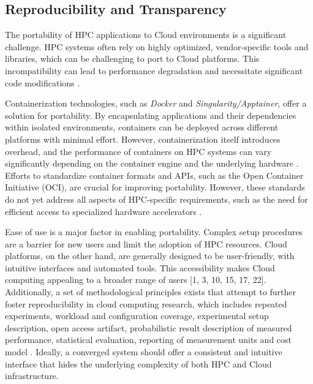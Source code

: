 




\subsection{Reproducibility and Transparency}
\label{sec:reproducetransparency}
    The portability of HPC applications to Cloud environments is a significant challenge. HPC systems often rely on highly optimized, vendor-specific tools and libraries, which can be challenging to port to Cloud platforms. This incompatibility can lead to performance degradation and necessitate significant code modifications \cite{zhao_resource_2023, liao_bridging_2021, choudhary_exascale_2021}.

    Containerization technologies, such as \textit{Docker} and \textit{Singularity/Apptainer}, offer a solution for portability. By encapsulating applications and their dependencies within isolated environments, containers can be deployed across different platforms with minimal effort. However, containerization itself introduces overhead, and the performance of containers on HPC systems can vary significantly depending on the container engine and the underlying hardware \cite{zhang_performance_2021, zhang_framework_2023, zhao_resource_2023}.
    Efforts to standardize container formats and APIs, such as the Open Container Initiative (OCI), are crucial for improving portability. However, these standards do not yet address all aspects of HPC-specific requirements, such as the need for efficient access to specialized hardware accelerators \cite{zhao_resource_2023}.

    Ease of use is a major factor in enabling portability. Complex setup procedures are a barrier for new users and limit the adoption of HPC resources. Cloud platforms, on the other hand, are generally designed to be user-friendly, with intuitive interfaces and automated tools. This accessibility makes Cloud computing appealing to a broader range of users [1, 3, 10, 15, 17, 22]. Additionally, a set of methodological principles exists that attempt to further foster reproducibility in cloud computing research, which includes repeated experiments, workload and configuration coverage, experimental setup description, open access artifact, probabilistic result description of measured performance, statistical evaluation, reporting of measurement units and cost model \cite{iosup-reproducibility}. Ideally, a converged system should offer a consistent and intuitive interface that hides the underlying complexity of both HPC and Cloud infrastructure.




